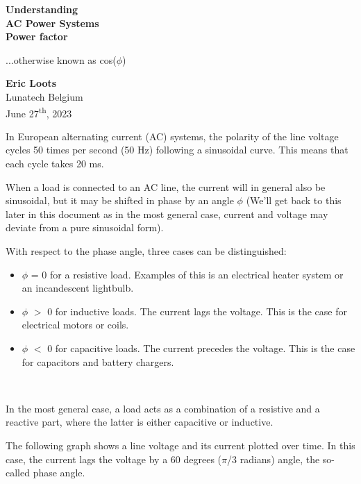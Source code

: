 \documentclass[a4paper]{article}
\begin{document}
\begin{titlepage}
    \begin{center}
        \vspace*{1cm}

        \Huge
        \textbf{Understanding\\
          AC Power Systems\\
          Power factor}

        \vspace{0.5cm}
        \LARGE
        ...otherwise known as cos($\phi$)

        \vspace{12cm}

        \Large
        \textbf{Eric Loots}\\
        Lunatech Belgium\\
        June 27\textsuperscript{th}, 2023

    \end{center}
\end{titlepage}

In European alternating current (AC) systems, the polarity of the line
voltage cycles 50 times per second (50 Hz) following a sinusoidal curve.
This means that each cycle takes 20 ms.

When a load is connected to an AC line, the current will in general also
be sinusoidal, but it may be shifted in phase by an angle $\phi$ (We'll
get back to this later in this document as in the most general case,
current and voltage may deviate from a pure sinusoidal form).

With respect to the phase angle, three cases can be distinguished:

\begin{itemize}
	\item $\phi$ = 0 for a resistive load. Examples of this is an electrical heater system or an incandescent lightbulb.
	\item $\phi$ $>$ 0 for inductive loads. The current lags the voltage. This is the case for electrical motors or coils.
	\item  $\phi$ $<$ 0 for capacitive loads. The current precedes the voltage. This is the case for capacitors and battery chargers.
\end{itemize}\

In the most general case, a load acts as a combination of a resistive
and a reactive part, where the latter is either capacitive or inductive.

The following graph shows a line voltage and its current plotted over time. In
this case, the current lags the voltage by a 60 degrees ($\pi$/3 radians) angle,
the so-called phase angle.
\end{document}
